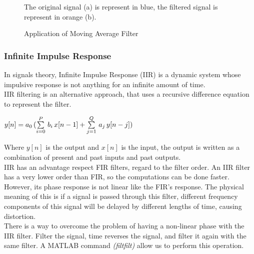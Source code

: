 \documentclass[tesi]{subfiles}
\begin{document}
\begin{figure}[H]	

\centering
{}

The original signal (a) is represent in blue, the filtered signal is represent in orange (b).
 \caption{Application of Moving Average Filter}
  \label{fig:Application of Moving Average	 Filter.}
\end{figure}
\subsubsection{Infinite Impulse Response} \label{ssc:Infite Impulse Response}
In signals theory, Infinite Impulse Response (IIR) is a dynamic system whose impulsive response is not anything for an infinite amount of time.\\
IIR filtering is an alternative approach, that uses a recursive difference equation to represent the filter.
\begin{center}
\begin{large}
$ y[n] = a_{0} \thinspace (\sum\limits_{i=0}^{P}\thinspace  b_{i} \thinspace x[n-1] + \sum\limits_{j=1}^{Q} \thinspace  a_{j} \thinspace  y[n-j])$

\end{large}\end{center}



\noindent Where $y[n]$ is the output and $x[n]$ is the input, the output is written as a combination of present and past inputs and past outputs.\\

\noindent IIR has an advantage respect FIR filters, regard to the filter order. An IIR filter has a very lower order than FIR, so the computations can be done faster. However, its phase response is not linear like the FIR’s response. The physical meaning of this is if a signal is passed through this filter, different frequency components of this signal will be delayed by different lengths of time, causing distortion. \\
There is a way to overcome the problem of having a non-linear phase with the IIR filter. 
Filter the signal, time reverses the signal, and filter it again with the same filter. A MATLAB command \textit{(filtfilt) } allow us to perform this operation. 
\end{document}

